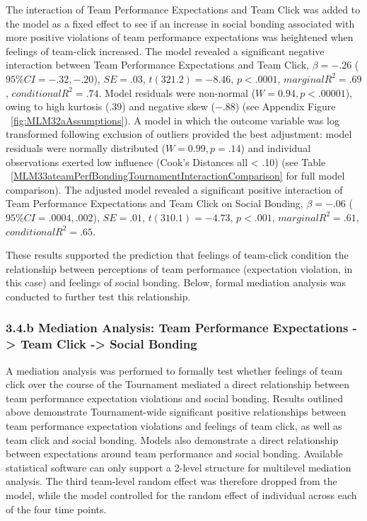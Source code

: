 \begin{landscape}
       The interaction of Team Performance Expectations and Team Click was added to the model as a fixed effect to see if an increase in social bonding associated with more positive violations of team performance expectations was heightened when feelings of team-click increased. The model revealed a significant negative interaction between Team Performance Expectations and Team Click,  $\beta = -.26$ ($95\% CI =  -.32, -.20$), $SE = .03$, $t(321.2) = -8.46$, $p < .0001$, $marginal R^2 = .69$, $conditional R^2 = .74$.  Model residuals were non-normal ($W = 0.94, p < .00001$), owing to high kurtosis ($.39$) and negative skew ($-.88$) (see Appendix Figure ~\ref{fig:MLM32aAssumptions}).
       A model in which the outcome variable was log transformed following exclusion of outliers provided the best adjustment: model residuals were normally distributed ($W = 0.99, p = .14$) and individual observations exerted low influence (Cook's Distances all < .10) (see Table ~\ref{MLM33ateamPerfBondingTournamentInteractionComparison} for full model comparison). The adjusted model revealed a significant positive interaction of Team Performance Expectations and Team Click on Social Bonding, $\beta = -.06$ ($95\% CI =  .0004, .002$), $SE = .01$, $t(310.1) = -4.73$, $p < .001$, $marginal R^2 = .61$, $conditional R^2 = .65$.

       These results supported the prediction that feelings of team-click condition the relationship between perceptions of team performance (expectation violation, in this case) and feelings of social bonding.  Below, formal mediation analysis was conducted to further test this relationship.


       



    \subsubsection{3.4.b Mediation Analysis: Team Performance Expectations -> Team Click -> Social Bonding}

    A mediation analysis was performed to formally test whether feelings of team click over the course of the Tournament mediated a direct relationship between team performance expectation violations and social bonding.  Results outlined above demonstrate Tournament-wide significant positive relationships between team performance expectation violations and feelings of team click, as well as team click and social bonding. Models also demonstrate a direct relationship between expectations around team performance and social bonding.  Available statistical software can only support a 2-level structure for multilevel mediation analysis. The third team-level random effect was therefore dropped from the model, while the model controlled for the random effect of individual across each of the four time points.


\end{landscape}
